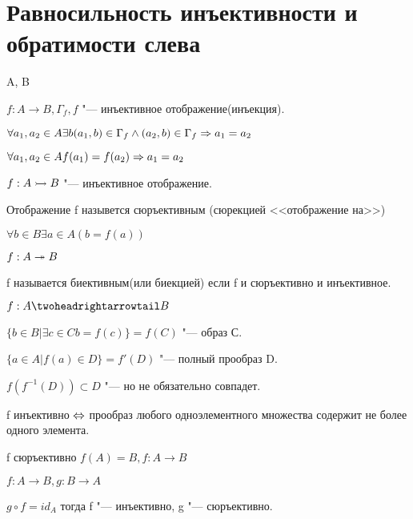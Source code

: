 ﻿\section{Равносильность инъективности и обратимости слева}

\begin{Def}
A, B

$f: A \to B, \Gamma_f, f$ "--- инъективное отображение(инъекция).

$\forall a_1, a_2 \in A \exists b (a_1, b) \in \Gamma_f \wedge (a_2, b) \in \Gamma_f \Rightarrow a_1 = a_2$

$\forall a_1, a_2 \in A f(a_1) = f(a_2) \Rightarrow a_1 = a_2$

$f: A \rightarrowtail B$ "--- инъективное отображение. 
\end{Def}


\begin{Def}
Отображение f назывется  сюръективным (сюрекцией <<отображение на>>)

$\forall b \in B \exists a \in A (b = f(a))$

$f: A \twoheadrightarrow B$

\end{Def}

\begin{Def}
f называется биективным(или биекцией) если f и сюръективно и инъективное. 

$f: A \thrat B$
 
$\{b \in B| \exists c \in C b = f(c)\} = f(C)$ "--- образ С.

$\{a \in A| f(a) \in D\} = f'(D)$ "--- полный прообраз D.
\end{Def}

$f(f^{-1}(D)) \subset D$ "--- но не обязательно совпадет.

f инъективно $\Leftrightarrow$ прообраз любого одноэлементного множества содержит не более одного элемента. 

f сюръективно $f(A) = B, f:A \to B$

\begin{theorem}{}
$f:A \to B, g:B \to A$

$g \circ f = id_A$ тогда f "--- инъективно, g "--- сюръективно.
\end{theorem}

